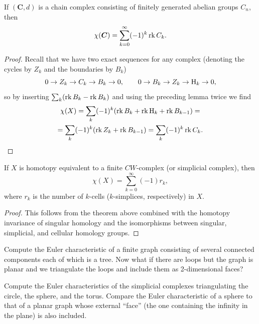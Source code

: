 \begin{thm}
    If $(\bm{C},d)$ is a chain complex consisting of finitely generated abelian groups $C_n$, then
    \[\chi(\boldsymbol{C})=\sum_{k=0}^\infty (-1)^k\operatorname{rk} C_k.\]
\end{thm}
\begin{proof}
    Recall that we have two exact sequences for any complex (denoting the cycles by $Z_k$ and the boundaries by $B_k$)
    \[0\to Z_k\to C_k\to B_k\to 0,\quad\quad 0\to B_k\to Z_k\to \mathrm{H}_k\to 0,\]
    so by inserting $\sum_k (\operatorname{rk} B_k-\operatorname{rk} B_k)$ and using the preceding lemma twice we find
    \begin{multline}
        \chi(X)=\sum_k(-1)^k(\operatorname{rk} B_k+\operatorname{rk} \mathrm{H}_k+\operatorname{rk} B_{k-1})=\\
        =\sum_k(-1)^k(\operatorname{rk} Z_k+\operatorname{rk} B_{k-1})=\sum_k (-1)^k\operatorname{rk} C_k.
    \end{multline}
\end{proof}
\begin{cor}
    If $X$ is homotopy equivalent to a finite $CW$-complex (or simplicial complex), then
    \[\chi(X)=\sum_{k=0}^\infty (-1)r_k,\]
    where $r_k$ is the number of $k$-cells ($k$-simplices, respectively) in $X$.
\end{cor}
\begin{proof}
    This follows from the theorem above combined with the homotopy invariance of singular homology and the isomorphisms between singular, simplicial, and cellular homology groups.
\end{proof}


\begin{xca}
    Compute the Euler characteristic of a finite graph consisting of several connected components each of which is a tree. Now what if there are loops but the graph is planar and we triangulate the loops and include them as 2-dimensional faces?
\end{xca}

\begin{xca}
    Compute the Euler characteristics of the simplicial complexes triangulating the circle, the sphere, and the torus. Compare the Euler characteristic of a sphere to that of a planar graph whose external ``face'' (the one containing the infinity in the plane) is also included.
\end{xca}



